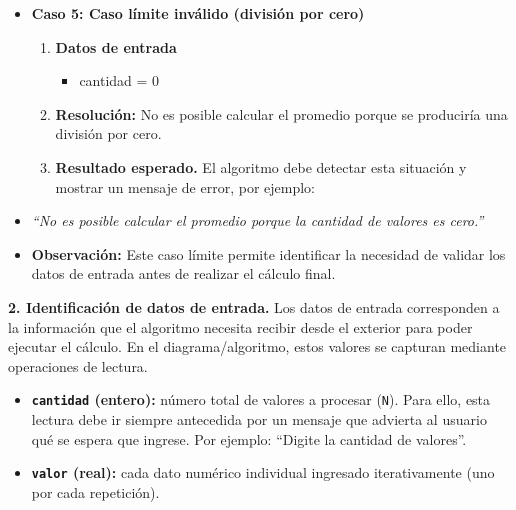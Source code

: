 \documentclass[12pt,twoside]{book}
\begin{document}
\begin{itemize}
\begin{enumerate}
										\[
										promedio = \frac{12}{1} = 12
										\]
									\item \textbf{Resultado esperado}
										\[
										promedio = 12
										\]
										
									\item Este caso representa el número mínimo posible de datos y permite verificar que el algoritmo funciona incluso cuando solo existe un valor.
								\end{enumerate}
							\item \textbf{Caso 5: Caso límite inválido (división por cero)}
								
								\begin{enumerate}
									\item \textbf{Datos de entrada}
										\begin{itemize}
											\item cantidad = 0
										\end{itemize}
									\item \textbf{Resolución:} No es posible calcular el promedio porque se produciría una división por cero.
									\item \textbf{Resultado esperado.} El algoritmo debe detectar esta situación y mostrar un mensaje de error, por ejemplo:
								\end{enumerate}
							
							\item \textit{“No es posible calcular el promedio porque la cantidad de valores es cero.”}
							\item \textbf{Observación: }Este caso límite permite identificar la necesidad de validar los datos de entrada antes de realizar el cálculo final.
					\end{itemize}
					
					\noindent
					\textbf{2. Identificación de datos de entrada.}
					Los datos de entrada corresponden a la información que el algoritmo necesita recibir desde el exterior para poder ejecutar el cálculo. En el diagrama/algoritmo, estos valores se capturan mediante operaciones de lectura.
					
					\begin{itemize}
						\item \textbf{\texttt{cantidad} (entero):} número total de valores a procesar (\texttt{N}). Para ello, esta lectura debe ir siempre antecedida por un mensaje que advierta al usuario qué se espera que ingrese. Por ejemplo:  ``Digite la cantidad de valores''.
						\item \textbf{\texttt{valor} (real):} cada dato numérico individual ingresado iterativamente (uno por cada repetición).
					\end{itemize}
					
\end{document}
